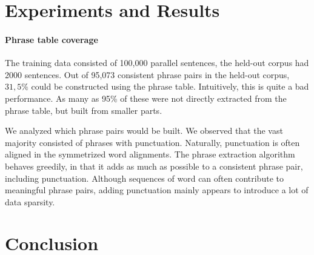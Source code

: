 \documentclass[11pt]{article}
\begin{document}
\section{Experiments and Results}
\label{Eval}



\paragraph{Phrase table coverage}
The training data consisted of 100,000 parallel sentences, the held-out corpus had 2000 sentences. Out of 95,073 consistent phrase pairs in the held-out corpus, $31,5\%$ could be constructed using the phrase table. Intuitively, this is quite a bad performance. As many as 95\% of these were not directly extracted from the phrase table, but built from smaller parts.

We analyzed which phrase pairs would be built. We observed that the vast majority consisted of phrases with punctuation. Naturally, punctuation is often aligned in the symmetrized word alignments. The phrase extraction algorithm behaves greedily, in that it adds as much as possible to a consistent phrase pair, including punctuation. Although sequences of word can often contribute to meaningful phrase pairs, adding punctuation mainly appears to introduce a lot of data sparsity. 


\section{Conclusion}
\label{Concl}
\end{document}
